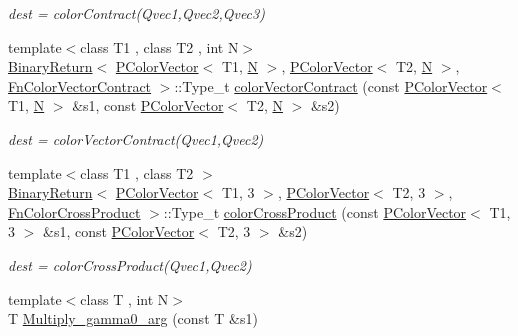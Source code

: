 \begin{DoxyCompactItemize}
\begin{DoxyCompactList}\small\item\em dest = color\+Contract(\+Qvec1,\+Qvec2,\+Qvec3) \end{DoxyCompactList}\item 
{\footnotesize template$<$class T1 , class T2 , int N$>$ }\\\mbox{\hyperlink{structENSEM_1_1BinaryReturn}{Binary\+Return}}$<$ \mbox{\hyperlink{classENSEM_1_1PColorVector}{P\+Color\+Vector}}$<$ T1, \mbox{\hyperlink{operator__name__util_8cc_a7722c8ecbb62d99aee7ce68b1752f337}{N}} $>$, \mbox{\hyperlink{classENSEM_1_1PColorVector}{P\+Color\+Vector}}$<$ T2, \mbox{\hyperlink{operator__name__util_8cc_a7722c8ecbb62d99aee7ce68b1752f337}{N}} $>$, \mbox{\hyperlink{structENSEM_1_1FnColorVectorContract}{Fn\+Color\+Vector\+Contract}} $>$\+::Type\+\_\+t \mbox{\hyperlink{namespaceENSEM_a666da055f6c28926add4d2570dc0e679}{color\+Vector\+Contract}} (const \mbox{\hyperlink{classENSEM_1_1PColorVector}{P\+Color\+Vector}}$<$ T1, \mbox{\hyperlink{operator__name__util_8cc_a7722c8ecbb62d99aee7ce68b1752f337}{N}} $>$ \&s1, const \mbox{\hyperlink{classENSEM_1_1PColorVector}{P\+Color\+Vector}}$<$ T2, \mbox{\hyperlink{operator__name__util_8cc_a7722c8ecbb62d99aee7ce68b1752f337}{N}} $>$ \&s2)
\begin{DoxyCompactList}\small\item\em dest = color\+Vector\+Contract(\+Qvec1,\+Qvec2) \end{DoxyCompactList}\item 
{\footnotesize template$<$class T1 , class T2 $>$ }\\\mbox{\hyperlink{structENSEM_1_1BinaryReturn}{Binary\+Return}}$<$ \mbox{\hyperlink{classENSEM_1_1PColorVector}{P\+Color\+Vector}}$<$ T1, 3 $>$, \mbox{\hyperlink{classENSEM_1_1PColorVector}{P\+Color\+Vector}}$<$ T2, 3 $>$, \mbox{\hyperlink{structENSEM_1_1FnColorCrossProduct}{Fn\+Color\+Cross\+Product}} $>$\+::Type\+\_\+t \mbox{\hyperlink{namespaceENSEM_a04433b1f7fdd4c3af3311092895168d7}{color\+Cross\+Product}} (const \mbox{\hyperlink{classENSEM_1_1PColorVector}{P\+Color\+Vector}}$<$ T1, 3 $>$ \&s1, const \mbox{\hyperlink{classENSEM_1_1PColorVector}{P\+Color\+Vector}}$<$ T2, 3 $>$ \&s2)
\begin{DoxyCompactList}\small\item\em dest = color\+Cross\+Product(\+Qvec1,\+Qvec2) \end{DoxyCompactList}\item 
{\footnotesize template$<$class T , int N$>$ }\\T \mbox{\hyperlink{namespaceENSEM_a7da1d54d1c7f3aeeff82db6994436bb4}{Multiply\+\_\+gamma0\+\_\+arg}} (const T \&s1)

\end{DoxyCompactItemize}
